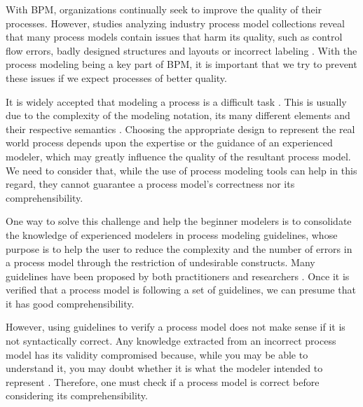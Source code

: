 \documentclass[a4paper,twoside]{article}
\begin{document}
With BPM, organizations continually seek to improve the quality of their processes. However, studies analyzing industry process model collections reveal that many process models contain issues that harm its quality, such as control flow errors, badly designed structures and layouts or incorrect labeling \citep{Mendling2008a,Leopold2016}. With the process modeling being a key part of BPM, it is important that we try to prevent these issues if we expect processes of better quality.

It is widely accepted that modeling a process is a difficult task \citep{Mendling2010}. This is usually due to the complexity of the modeling notation, its many different elements and their respective semantics \citep{Leopold2016}. Choosing the appropriate design to represent the real world process depends upon the expertise or the guidance of an experienced modeler, which may greatly influence the quality of the resultant process model. We need to consider that, while the use of process modeling tools can help in this regard, they cannot guarantee a process model's correctness nor its comprehensibility.



One way to solve this challenge and help the beginner modelers is to consolidate the knowledge of experienced modelers in process modeling guidelines, whose purpose is to help the user to reduce the complexity and the number of errors in a process model through the restriction of undesirable constructs. Many guidelines have been proposed by both practitioners \citep{Silver2009,White2008,Allweyer2010} and researchers \citep{Becker2000,Mendling2007,Vanderfeesten2008,Correia2012}. Once it is verified that a process model is following a set of guidelines, we can presume that it has good comprehensibility.

However, using guidelines to verify a process model does not make sense if it is not syntactically correct. Any knowledge extracted from an incorrect process model has its validity compromised because, while you may be able to understand it, you may doubt whether it is what the modeler intended to represent \citep{Reijers2015}. Therefore, one must check if a process model is correct before considering its comprehensibility.
\end{document}
